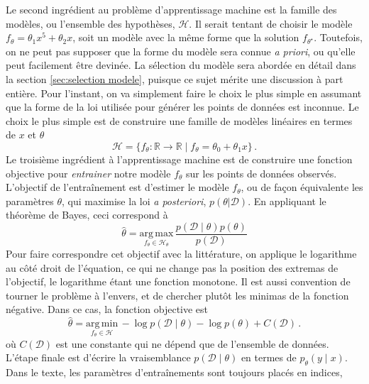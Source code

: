 Le second ingrédient au problème d'apprentissage machine est la famille des modèles, ou l'ensemble des hypothèses, $\mathcal{H}$. 
Il serait tentant de choisir le modèle $f_\theta = \theta_1 x^{5} + \theta_2 x$, soit un modèle avec la même forme que la solution 
$f_{\theta^{\star}}$. Toutefois, on ne peut pas supposer que la forme du modèle sera connue \textit{a priori}, 
ou qu'elle peut facilement être devinée. La sélection du modèle sera abordée en détail dans la section \ref{sec:selection modele}, 
puisque ce sujet mérite une discussion à part entière.
Pour l'instant, on va simplement faire le choix le plus simple en assumant que la forme de 
la loi utilisée pour générer les points de données est inconnue. 
Le choix le plus simple est de construire une famille de modèles linéaires en termes de $x$ et $\theta$
\begin{equation}\label{eq:modele lineaire}
        \mathcal{H} = \{f_\theta:\mathbb{R} \rightarrow  \mathbb{R} \mid f_\theta = \theta_0 + \theta_1 x\}\, . 
\end{equation} 
Le troisième ingrédient à l'apprentissage machine est de construire une fonction objective pour \textit{entrainer} notre modèle $f_\theta$ sur les points 
de données observés. 
L'objectif de l'entraînement est d'estimer le modèle $f_\theta$, ou de façon équivalente les paramètres $\theta$, qui maximise la loi \textit{a posteriori}, $p(\theta | \mathcal{D})$. En appliquant 
le théorème de Bayes, ceci correspond à
\begin{equation}
        \hat{\theta} = \underset{f_\theta \in \mathcal{H}_\theta}{\mathrm{arg\, max}}\, \frac{p(\mathcal{D} \mid \theta) p(\theta)}{p(\mathcal{D})}
\end{equation} 
Pour faire correspondre cet objectif avec la littérature, on applique le logarithme au côté droit de l'équation, ce qui ne change pas la position des extremas de 
l'objectif, le logarithme étant une fonction monotone. Il est aussi convention de tourner le problème à l'envers, et de chercher plutôt les minimas de la fonction négative. Dans 
ce cas, la fonction objective est
\begin{equation}
        \hat{\theta} = \underset{f_\theta \in \mathcal{H}}{\mathrm{arg\, min}}\, -\log p(\mathcal{D} \mid \theta) - \log p(\theta) + C(\mathcal{D})\, .
\end{equation} 
où $C(\mathcal{D})$ est une constante qui ne dépend que de l'ensemble de données. L'étape finale est d'écrire la vraisemblance $p(\mathcal{D} \mid \theta)$ 
en termes de $p_\theta( y \mid x)$. Dans le texte, les paramètres d'entraînements sont toujours placés en indices, 
